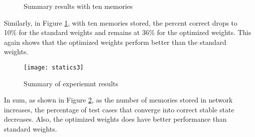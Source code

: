 \begin{figure}[h]
	\centering
	\caption{Summary results with ten memories}
	\label{fg:ost5}
\end{figure}

Similarly, in Figure \ref{fg:ost5}, with ten memories stored, the percent correct drops to 10\% for the standard weights and remains at 36\% for the optimized weights. This again shows that the optimized weights perform better than the standard weights.

\begin{figure}[h]
\centering
\texttt{[image: statics3]}
\caption{Summary of experiemnt results}
\label{fg:sum}
\end{figure}

In sum, as shown in Figure \ref{fg:sum}, as the number of memories stored in network increases, the percentage of test cases that converge into correct stable state decreases. Also, the optimized weights does have better performance than standard weights. \newpage



